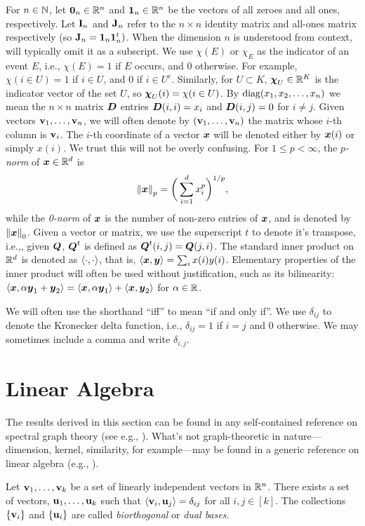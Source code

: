 For $n\in \mathbb{N}$, let $\vb{0}_n\in\mathbb{R}^n$ and $\vb{1}_n\in\mathbb{R}^n$ be the vectors of all zeroes and all ones, respectively. Let $\vb{I}_n$ and $\vb{J}_n$  refer to the $n\times n$ identity matrix and all-ones matrix respectively (so $\vb{J}_n=\vb{1}_n\vb{1}_n^t)$. When the dimension $n$ is understood from context, will typically omit it as a subscript. We use $\chi(E)$ or $\chi_E$ as the indicator of an event $E$, i.e., $\chi(E)=1$ if $E$ occurs, and 0 otherwise. For example, $\chi(i\in U)=1$ if $i\in U$, and 0 if $i\in U^c$.  Similarly, for $U\subset K$,  $\boldsymbol{\chi}_U\in\mathbb{R}^K$ is the indicator vector of the set $U$, so $\boldsymbol{\chi}_U(i)=\chi(i\in U)$. 
By $\text{diag}(x_1,x_2,\dots,x_n)$ we mean the $n\times n$ matrix $\vb*{D}$ entries $\vb*{D}(i,i)=x_i$ and $\vb*{D}(i,j)=0$ for $i\neq j$. Given vectors $\vb{v}_1,\dots,\vb{v}_n$, we will often denote by $(\vb{v}_1,\dots,\vb{v}_n)$ the matrix whose $i$-th column is $\vb{v}_i$. The $i$-th coordinate of a vector $\vb*{x}$ will be denoted either by $\vb*{x}(i)$ or simply $x(i)$. We trust this will not be overly confusing.  For $1\leq p<\infty$, the \emph{$p$-norm} of $\vb*{x}\in \mathbb{R}^d$ is 
\[\norm{\vb*{x}}_p = \bigg(\sum_{i=1}^d x_i^p\bigg)^{1/p},\]
while the \emph{0-norm} of $\vb*{x}$ is the number of non-zero entries of $\vb*{x}$, and is denoted by $\norm{\vb*{x}}_0$.  Given a vector or matrix, we use the superscript $t$ to denote it's transpose, i.e.,, given $\vb*{{Q}}$, $\vb*{{Q}}^t$ is defined as $\vb*{{Q}}^t(i,j) = \vb*{{Q}}(j,i)$. The standard inner product on $\mathbb{R}^d$ is denoted as $\langle\cdot,\cdot\rangle$, that is, $\langle \vb*{x},\vb*{y}\rangle = \sum_i x(i)y(i)$. Elementary properties of the inner product will often be used without justification, such as its bilinearity: $\langle \vb*{x},\alpha\vb*{y}_1+\vb*{y}_2\rangle  = \langle \vb*{x},\alpha\vb*{y}_1\rangle + \langle \vb*{x},\vb*{y}_2\rangle$ for $\alpha\in\mathbb{R}$.  

We will often use the shorthand ``iff'' to mean ``if and only if''. We use $\delta_{ij}$ to denote the Kronecker delta function, i.e., $\delta_{ij} = 1$ if $i=j$ and 0 otherwise. We may sometimes include a comma and write $\delta_{i,j}$. 

\section{Linear Algebra}
\label{sec:background_linear}
The results derived in this section can be found in any self-contained reference on spectral graph theory (see e.g., \cite{spielman2009spectral,chung1997spectral}). What's not graph-theoretic in nature---dimension, kernel, similarity, for example---may be found in a generic reference on linear algebra (e.g.,  \cite{axler1997linear}). 

\begin{lemma}
\label{lem:bi-orthogonal_bases}
Let $\vb{v}_1,\dots,\vb{v}_k$ be a set of linearly independent vectors in $\mathbb{R}^n$. There exists a set of vectors, $\vb{u}_1,\dots,\vb{u}_k$ such that $\langle \vb{v}_i,\vb{u}_j\rangle = \delta_{ij}$ for all $i,j\in[k]$. The collections $\{\vb{v}_i\}$ and $\{\vb{u}_i\}$ are called \emph{biorthogonal} or \emph{dual bases}.  
\end{lemma}

